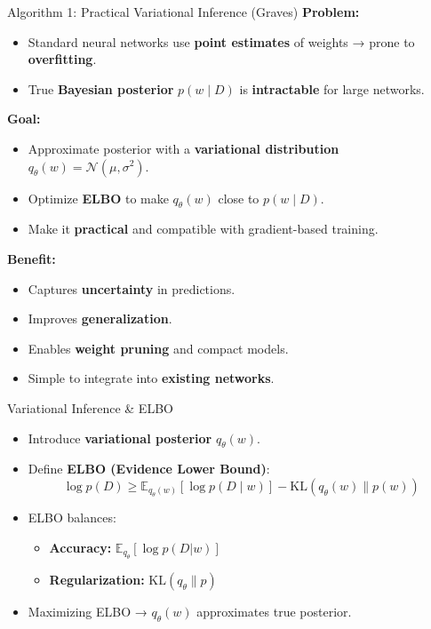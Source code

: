 \documentclass[10pt]{beamer}
\begin{document}
\begin{frame}{Algorithm 1: Practical Variational Inference (Graves)}
\textbf{Problem:}
\begin{itemize}
    \item Standard neural networks use \textbf{point estimates} of weights → prone to \textbf{overfitting}.
    \item True \textbf{Bayesian posterior} $p(w \mid D)$ is \textbf{intractable} for large networks.
\end{itemize}

\textbf{Goal:}
\begin{itemize}
    \item Approximate posterior with a \textbf{variational distribution} $q_\theta(w) = \mathcal{N}(\mu, \sigma^2)$.
    \item Optimize \textbf{ELBO} to make $q_\theta(w)$ close to $p(w \mid D)$.
    \item Make it \textbf{practical} and compatible with gradient-based training.
\end{itemize}

\textbf{Benefit:}
\begin{itemize}
    \item Captures \textbf{uncertainty} in predictions.
    \item Improves \textbf{generalization}.
    \item Enables \textbf{weight pruning} and compact models.
    \item Simple to integrate into \textbf{existing networks}.
\end{itemize}
\end{frame}

\begin{frame}{Variational Inference \& ELBO}
\begin{itemize}
    \item Introduce \textbf{variational posterior} $q_\theta(w)$.
    \item Define \textbf{ELBO (Evidence Lower Bound)}:
\[
\log p(D) \ge \mathbb{E}_{q_\theta(w)}[\log p(D \mid w)] - \mathrm{KL}(q_\theta(w) \| p(w))
\]
    \item ELBO balances:
    \begin{itemize}
        \item \textbf{Accuracy:} $\mathbb{E}_{q_\theta}[\log p(D|w)]$
        \item \textbf{Regularization:} $\mathrm{KL}(q_\theta \| p)$
    \end{itemize}
    \item Maximizing ELBO → $q_\theta(w)$ approximates true posterior.
\end{itemize}
\end{frame}
\end{document}
